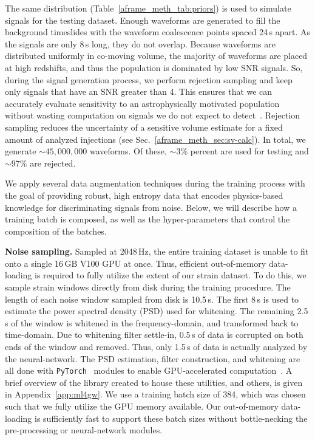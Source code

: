 \begin{refsection}
The same distribution (Table~\ref{aframe_meth_tab:priors}) is used to simulate signals for the testing dataset. 
Enough waveforms are generated to fill the background timeslides with the waveform coalescence points spaced 24\,s apart. 
As the signals are only 8\,s long, they do not overlap. 
Because waveforms are distributed uniformly in co-moving volume, the majority of waveforms are placed at high redshifts, and thus the population is dominated by low SNR signals. 
So, during the signal generation process, we perform rejection sampling and keep only signals that have an SNR greater than 4. 
This ensures that we can accurately evaluate sensitivity to an astrophysically motivated population without wasting computation on signals we do not expect to detect~\cite{ligo_scientific_collaboration_and_virgo_2023_7890437}. 
Rejection sampling reduces the uncertainty of a sensitive volume estimate for a fixed amount of analyzed injections (see Sec.~\ref{aframe_meth_sec:sv-calc}). 
In total, we generate $\sim 45,000,000$ waveforms. 
Of these, $\sim3\%$ percent are used for testing and $\sim97\%$ are rejected. 

We apply several data augmentation techniques during the training process with the goal of providing robust, high entropy data that encodes physics-based knowledge for discriminating signals from noise. 
Below, we will describe how a training batch is composed, as well as the hyper-parameters that control the composition of the batches. 

\textbf{Noise sampling.} \label{aframe_meth_sec:noise-sampling}
Sampled at 2048\,Hz, the entire training dataset is unable to fit onto a single 16\,GB V100 GPU at once. 
Thus, efficient out-of-memory data-loading is required to fully utilize the extent of our strain dataset. 
To do this, we sample strain windows directly from disk during the training procedure. 
The length of each noise window sampled from disk is 10.5\,s. 
The first 8\,s is used to estimate the power spectral density (PSD) used for whitening. 
The remaining 2.5\,s of the window is whitened in the frequency-domain, and transformed back to time-domain. 
Due to whitening filter settle-in, 0.5\,s of data is corrupted on both ends of the window and removed. 
Thus, only 1.5\,s of data is actually analyzed by the neural-network. 
The PSD estimation, filter construction, and whitening are all done with \texttt{PyTorch}~\cite{10.5555/3454287.3455008} modules to enable GPU-accelerated computation~\cite{nousi2022deep}.
A brief overview of the library created to house these utilities, and others, is given in Appendix~\ref{app:ml4gw}.
We use a training batch size of 384, which was chosen such that we fully utilize the GPU memory available. 
Our out-of-memory data-loading is sufficiently fast to support these batch sizes without bottle-necking the pre-processing or neural-network modules.


\end{refsection}
